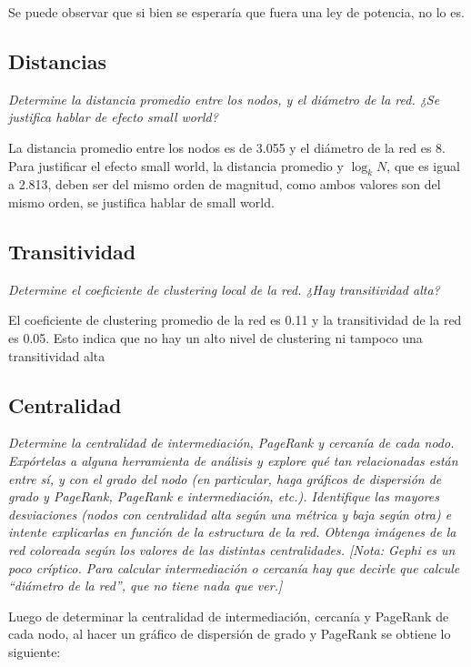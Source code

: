 \documentclass[12pt]{article}
\begin{document}
Se puede observar que si bien se esperaría que fuera una ley de potencia, no lo es.
\subsection{Distancias} 
\textit{Determine la distancia promedio entre los nodos, y el diámetro de la red. ¿Se justifica hablar de efecto small world?}

La distancia promedio entre los nodos es de 3.055 y el diámetro de la red es 8. Para justificar el efecto small world, la distancia promedio y $\log_{k} N$, que es igual a 2.813, deben ser del mismo orden de magnitud, como ambos valores son del mismo orden, se justifica hablar de small world.


\subsection{Transitividad} 
\textit{Determine el coeficiente de clustering local de la red. ¿Hay transitividad alta?}

El coeficiente de clustering promedio de la red es 0.11 y la transitividad de la red es 0.05. Esto indica que no hay un alto nivel de clustering ni tampoco una transitividad alta


\subsection{Centralidad}  
\textit{Determine la centralidad de intermediación, PageRank y cercanía de cada nodo. Expórtelas a alguna herramienta de análisis y explore qué tan relacionadas están entre sí, y con el grado del nodo (en particular, haga gráficos de dispersión de grado y PageRank, PageRank e intermediación, etc.). Identifique las mayores desviaciones (nodos con centralidad alta según una métrica y baja según otra) e intente explicarlas en función de la estructura de la red. Obtenga imágenes de la red coloreada según los valores de las distintas centralidades. [Nota: Gephi es un poco críptico. Para calcular intermediación o cercanía hay que decirle que calcule ``diámetro de la red'', que no tiene nada que ver.]}

Luego de determinar la centralidad de intermediación, cercanía y PageRank de cada nodo, al hacer un gráfico de dispersión de grado y PageRank se obtiene lo siguiente:
\end{document}
